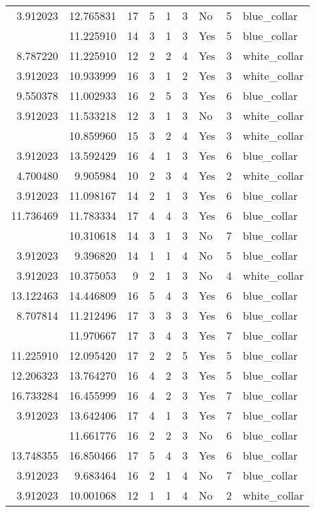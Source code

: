 \documentclass[
]{article}
\begin{document}
\begin{longtable}[t]{rrrrrllrl}
3.912023 & 12.765831 & 17 & 5 & 1 & 3 & No & 5 & blue\_collar\\
\addlinespace
3.912023 & 11.225910 & 14 & 3 & 1 & 3 & Yes & 5 & blue\_collar\\
8.787220 & 11.225910 & 12 & 2 & 2 & 4 & Yes & 3 & white\_collar\\
3.912023 & 10.933999 & 16 & 3 & 1 & 2 & Yes & 3 & white\_collar\\
9.550378 & 11.002933 & 16 & 2 & 5 & 3 & Yes & 6 & blue\_collar\\
3.912023 & 11.533218 & 12 & 3 & 1 & 3 & No & 3 & white\_collar\\
\addlinespace
8.639411 & 10.859960 & 15 & 3 & 2 & 4 & Yes & 3 & white\_collar\\
3.912023 & 13.592429 & 16 & 4 & 1 & 3 & Yes & 6 & blue\_collar\\
4.700480 & 9.905984 & 10 & 2 & 3 & 4 & Yes & 2 & white\_collar\\
3.912023 & 11.098167 & 14 & 2 & 1 & 3 & Yes & 6 & blue\_collar\\
11.736469 & 11.783334 & 17 & 4 & 4 & 3 & Yes & 6 & blue\_collar\\
\addlinespace
3.912023 & 10.310618 & 14 & 3 & 1 & 3 & No & 7 & blue\_collar\\
3.912023 & 9.396820 & 14 & 1 & 1 & 4 & No & 5 & blue\_collar\\
3.912023 & 10.375053 & 9 & 2 & 1 & 3 & No & 4 & white\_collar\\
13.122463 & 14.446809 & 16 & 5 & 4 & 3 & Yes & 6 & blue\_collar\\
8.707814 & 11.212496 & 17 & 3 & 3 & 3 & Yes & 6 & blue\_collar\\
\addlinespace
8.860783 & 11.970667 & 17 & 3 & 4 & 3 & Yes & 7 & blue\_collar\\
11.225910 & 12.095420 & 17 & 2 & 2 & 5 & Yes & 5 & blue\_collar\\
12.206323 & 13.764270 & 16 & 4 & 2 & 3 & Yes & 5 & blue\_collar\\
16.733284 & 16.455999 & 16 & 4 & 2 & 3 & Yes & 7 & blue\_collar\\
3.912023 & 13.642406 & 17 & 4 & 1 & 3 & Yes & 7 & blue\_collar\\
\addlinespace
8.993427 & 11.661776 & 16 & 2 & 2 & 3 & No & 6 & blue\_collar\\
13.748355 & 16.850466 & 17 & 5 & 4 & 3 & Yes & 6 & blue\_collar\\
3.912023 & 9.683464 & 16 & 2 & 1 & 4 & No & 7 & blue\_collar\\
3.912023 & 10.001068 & 12 & 1 & 1 & 4 & No & 2 & white\_collar\\

\end{longtable}
\end{document}
